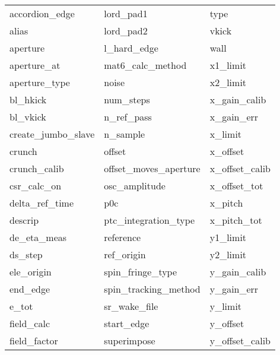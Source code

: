  \begin{tabular}{lll} \toprule
accordion_edge              & lord_pad1                   & type                        \\
alias                       & lord_pad2                   & vkick                       \\
aperture                    & l_hard_edge                 & wall                        \\
aperture_at                 & mat6_calc_method            & x1_limit                    \\
aperture_type               & noise                       & x2_limit                    \\
bl_hkick                    & num_steps                   & x_gain_calib                \\
bl_vkick                    & n_ref_pass                  & x_gain_err                  \\
create_jumbo_slave          & n_sample                    & x_limit                     \\
crunch                      & offset                      & x_offset                    \\
crunch_calib                & offset_moves_aperture       & x_offset_calib              \\
csr_calc_on                 & osc_amplitude               & x_offset_tot                \\
delta_ref_time              & p0c                         & x_pitch                     \\
descrip                     & ptc_integration_type        & x_pitch_tot                 \\
de_eta_meas                 & reference                   & y1_limit                    \\
ds_step                     & ref_origin                  & y2_limit                    \\
ele_origin                  & spin_fringe_type            & y_gain_calib                \\
end_edge                    & spin_tracking_method        & y_gain_err                  \\
e_tot                       & sr_wake_file                & y_limit                     \\
field_calc                  & start_edge                  & y_offset                    \\
field_factor                & superimpose                 & y_offset_calib              \\

\end{tabular}
